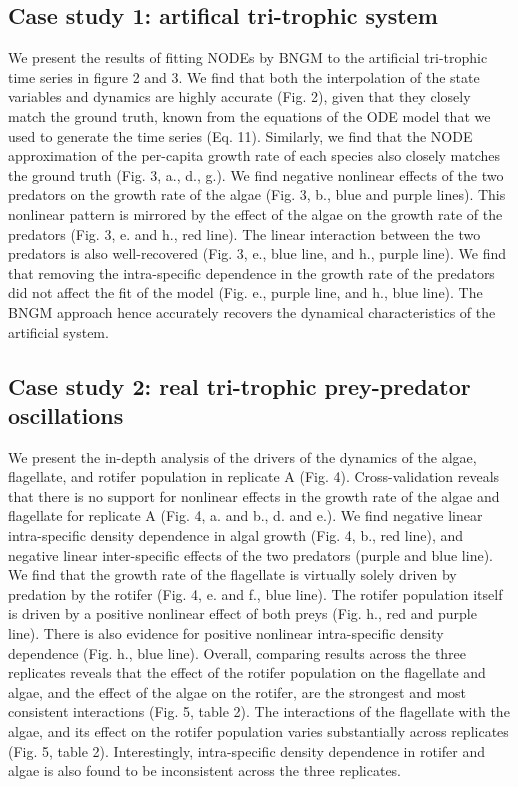 \documentclass[11pt, oneside]{article}
\begin{document}
\subsection{Case study 1: artifical tri-trophic system}

We present the results of fitting NODEs by BNGM to the artificial tri-trophic time series in figure 2 and 3.
We find that both the interpolation of the state variables and dynamics are highly accurate (Fig. 2), given that they closely match the ground truth, known from the equations of the ODE model that we used to generate the time series (Eq. 11).
Similarly, we find that the NODE approximation of the per-capita growth rate of each species also closely matches the ground truth (Fig. 3, a., d., g.). 
We find negative nonlinear effects of the two predators on the growth rate of the algae (Fig. 3, b., blue and purple lines).
This nonlinear pattern is mirrored by the effect of the algae on the growth rate of the predators (Fig. 3, e. and h., red line).
The linear interaction between the two predators is also well-recovered (Fig. 3, e., blue line, and h., purple line).
We find that removing the intra-specific dependence in the growth rate of the predators did not affect the fit of the model (Fig. e., purple line, and h., blue line).
The BNGM approach hence accurately recovers the dynamical characteristics of the artificial system.

\subsection{Case study 2: real tri-trophic prey-predator oscillations}

We present the in-depth analysis of the drivers of the dynamics of the algae, flagellate, and rotifer population in replicate A (Fig. 4).
Cross-validation reveals that there is no support for nonlinear effects in the growth rate of the algae and flagellate for replicate A (Fig. 4, a. and b., d. and e.). 
We find negative linear intra-specific density dependence in algal growth (Fig. 4, b., red line), and negative linear inter-specific effects of the two predators (purple and blue line).
We find that the growth rate of the flagellate is virtually solely driven by predation by the rotifer (Fig. 4, e. and f., blue line).
The rotifer population itself is driven by a positive nonlinear effect of both preys (Fig. h., red and purple line).
There is also evidence for positive nonlinear intra-specific density dependence (Fig. h., blue line).
Overall, comparing results across the three replicates reveals that the effect of the rotifer population on the flagellate and algae, and the effect of the algae on the rotifer, are the strongest and most consistent interactions (Fig. 5, table 2).
The interactions of the flagellate with the algae, and its effect on the rotifer population varies substantially across replicates (Fig. 5, table 2). 
Interestingly, intra-specific density dependence in rotifer and algae is also found to be inconsistent across the three replicates.
\end{document}
